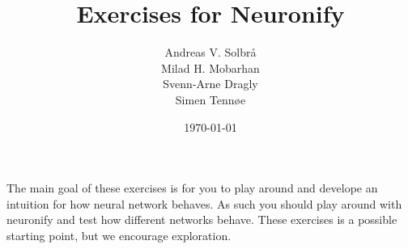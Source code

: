 \documentclass[12pt]{article}
\title{Exercises for Neuronify}
\author{Andreas V. Solbr\aa \\
Milad H. Mobarhan \\
Svenn-Arne Dragly \\
Simen Tenn\o e}
\date{\today}
\begin{document}
\maketitle

The main goal of these exercises is for you to play around and develope an intuition for how neural network behaves. As such you should play around with neuronify and test how different networks behave. These exercises is a possible starting point, but we encourage exploration.





\end{document}
